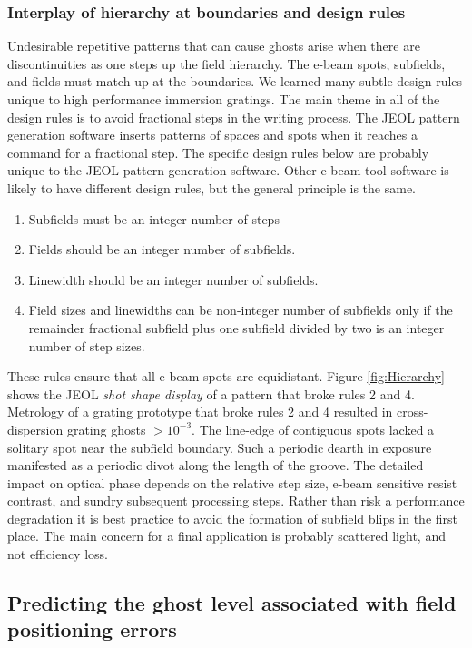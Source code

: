 \subsubsection{Interplay of hierarchy at boundaries and design rules}
\label{sec:Boundaries}
Undesirable repetitive patterns that can cause ghosts arise when there are discontinuities as one steps up the field hierarchy.  The e-beam spots, subfields, and fields must match up at the boundaries.  We learned many subtle design rules unique to high performance immersion gratings.  The main theme in all of the design rules is to avoid fractional steps in the writing process.  The JEOL pattern generation software inserts patterns of spaces and spots when it reaches a command for a fractional step.  The specific design rules below are probably unique to the JEOL pattern generation software.  Other e-beam tool software is likely to have different design rules, but the general principle is the same.  
\begin{enumerate}
  \item Subfields must be an integer number of steps
  \item Fields should be an integer number of subfields.  
  \item Linewidth should be an integer number of subfields.
  \item Field sizes and linewidths can be non-integer number of subfields only if the remainder fractional subfield plus one subfield divided by two is an integer number of step sizes.
\end{enumerate}   

These rules ensure that all e-beam spots are equidistant.  Figure \ref{fig:Hierarchy}  shows the JEOL \emph{shot shape display} of a pattern that broke rules 2 and 4.  Metrology of a grating prototype that broke rules 2 and 4 resulted in cross-dispersion grating ghosts $>10^{-3}$.  The line-edge of contiguous spots lacked a solitary spot near the subfield boundary.  Such a periodic dearth in exposure manifested as a periodic divot along the length of the groove.  The detailed impact on optical phase depends on the relative step size, e-beam sensitive resist contrast, and sundry subsequent processing steps.  Rather than risk a performance degradation it is best practice to avoid the formation of subfield blips in the first place.  The main concern for a final application is probably scattered light, and not efficiency loss. 


\subsection{Predicting the ghost level associated with field positioning errors}
\label{sec:Ghosts}


